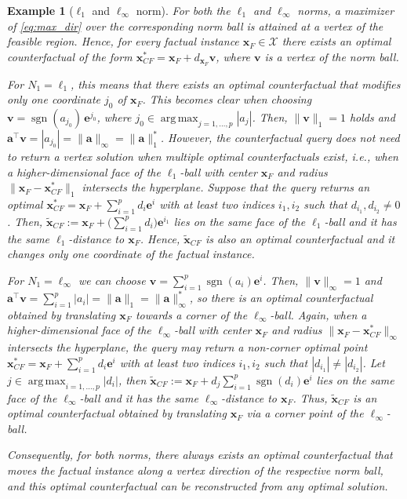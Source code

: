 \documentclass{article}
\newtheorem{example}[theorem]{Example}
\DeclareMathOperator*{\argmax}{arg\,max}
\DeclareMathOperator*{\sgn}{sgn}
\begin{document}
\begin{example}[$\ell_1$ and $\ell_{\infty}$ norm]\label{example:l1-linf}
For both the $\ell_1$ and $\ell_{\infty}$ norms, a maximizer of \eqref{eq:max_dir} over the corresponding norm ball is attained at a vertex of the feasible region. Hence, for every factual instance $\bm{x}_F\in\mathcal{X}$ there exists an optimal counterfactual of the form $\bm{x}_{CF}^* = \bm{x}_F + d_{\bm{x}_F}\bm{v}$,
where $\bm{v}$ is a vertex of the norm ball.

For $N_1=\ell_1$, this means that there exists an optimal counterfactual that modifies only one coordinate $j_{0}$ of $\bm{x}_F$. This becomes clear when choosing $\bm{v} = \sgn(a_{j_{0}})\,\bm{e}^{j_{0}}$, where $j_{0} \in \argmax_{j=1,\ldots,p} |a_j|$. Then, $\|\bm{v}\|_1 = 1$ holds and $\bm{a}^\top\bm{v} = |a_{j_{0}}|= \|\bm{a}\|_{\infty} = \|\bm{a}\|_{1}^*$. However, the counterfactual query does not need to return a vertex solution when multiple optimal counterfactuals exist, \textit{i.e.}, when a higher-dimensional face of the $\ell_1$-ball with center $\bm{x}_F$ and radius $\|\bm{x}_F - \bm{x}_{CF}^*\|_1$ intersects the hyperplane. Suppose that the query returns an optimal $\bm{x}_{CF}^* = \bm{x}_F + \sum_{i=1}^p d_i \bm{e}^i$ with at least two indices $i_1,i_2$ such that $d_{i_1}, d_{i_2} \neq 0$. Then, $
\tilde{\bm{x}}_{CF} := \bm{x}_F + \Big(\sum_{i=1}^p d_i\Big)\bm{e}^{i_1}$ lies on the same face of the $\ell_1$-ball and it has the same $\ell_1$-distance to $\bm{x}_F$. Hence, $\tilde{\bm{x}}_{CF}$ is also an optimal counterfactual and it changes only one coordinate of the factual instance.

For $N_1=\ell_{\infty}$ we can choose $\bm{v} = \sum_{i=1}^p \sgn(a_i)\bm{e}^i$.
Then, $\|\bm{v}\|_{\infty} = 1$ and $\bm{a}^\top\bm{v} = \sum_{i=1}^p |a_i| = \|\bm{a}\|_1=\|\bm{a}\|_{\infty}^*$, so there is an optimal counterfactual obtained by translating $\bm{x}_F$ towards a corner of the $\ell_{\infty}$-ball. Again, when a higher-dimensional face of the $\ell_{\infty}$-ball with center $\bm{x}_F$ and radius $\|\bm{x}_F - \bm{x}_{CF}^*\|_{\infty}$ intersects the hyperplane, the query may return a non-corner optimal point $\bm{x}_{CF}^* = \bm{x}_F + \sum_{i=1}^p d_i \bm{e}^i$ with at least two indices $i_1,i_2$ such that $|d_{i_1}| \neq |d_{i_2}|$. Let $j \in \argmax_{i=1,\ldots,p} |d_i|$, then $\tilde{\bm{x}}_{CF} := \bm{x}_F + d_j \sum_{i=1}^p \sgn(d_i)\bm{e}^i$ lies on the same face of the $\ell_{\infty}$-ball and it has the same $\ell_{\infty}$-distance to $\bm{x}_F$. Thus, $\tilde{\bm{x}}_{CF}$ is an optimal counterfactual obtained by translating $\bm{x}_F$ via a corner point of the $\ell_{\infty}$-ball.

Consequently, for both norms, there always exists an optimal counterfactual that moves the factual instance along a vertex direction of the respective norm ball, and this optimal counterfactual can be reconstructed from any optimal solution.
\end{example}
\end{document}
